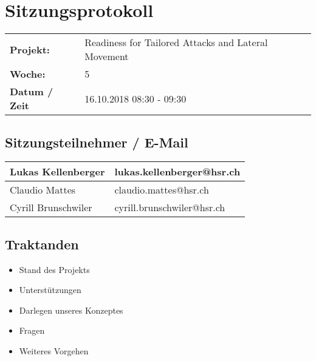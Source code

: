 \newcommand{\TITLE}{Readiness for Tailored Attacks and Lateral Movement Detection}
\newcommand{\REVIEW}{Weekly Meeting}
\newcommand{\VERSION}{0.0}





\section*{Sitzungsprotokoll}

\begin{tabular}{p{4cm} p{12cm}}
    \textbf{Projekt:} & Readiness for Tailored Attacks and Lateral Movement  \\
    \textbf{Woche:} & 5 \\
    \textbf{Datum / Zeit} & 16.10.2018 08:30 - 09:30 \\
\end{tabular}

\subsection*{Sitzungsteilnehmer / E-Mail}
\begin{table}[H]
    \centering
    \begin{tabular}{p{4cm} p{12cm}} \hline
        Lukas Kellenberger & lukas.kellenberger@hsr.ch \\ \hline
        Claudio Mattes & claudio.mattes@hsr.ch \\ \hline
        Cyrill Brunschwiler & cyrill.brunschwiler@hsr.ch \\ \hline
    \end{tabular}
\end{table}

\vspace{1cm}

\subsection*{Traktanden}
\begin{itemize}
    \item Stand des Projekts
    \item Unterstützungen
    \item Darlegen unseres Konzeptes
    \item Fragen
    \item Weiteres Vorgehen
\end{itemize}

\clearpage


